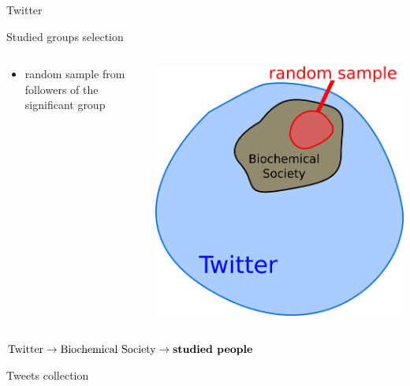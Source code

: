 \documentclass{beamer}
\begin{document}
\begin{frame}[fragile]
\begin{columns}[T]
\begin{column}{.33\textwidth}
\begin{block}{Twitter}
\end{block}
\begin{block}{Studied groups selection}
    \begin{columns}
        \begin{column}{.5\textwidth}
            \begin{itemize}
                \item random sample from followers of the significant group
            \end{itemize}
        \end{column}
        \begin{column}{.5\textwidth}
            \center
            \includegraphics[scale=0.45]{./Pics/sets.png}
        \end{column}
    \end{columns}
    \center
    $\text{Twitter} \rightarrow \text{Biochemical Society} \rightarrow \text{\textbf{studied people}}$
\end{block}
\begin{block}{Tweets collection}
    \begin{columns}
    	\begin{itemize}

\end{itemize}
\end{columns}
\end{block}
\end{column}
\end{columns}
\end{frame}
\end{document}
